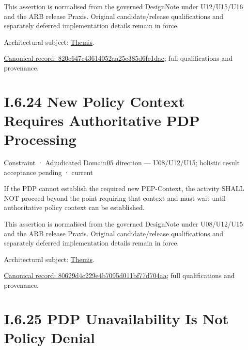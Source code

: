 This assertion is normalised from the governed DesignNote under U12/U15/U16 and the ARB release Praxis. Original candidate/release qualifications and separately deferred implementation details remain in force.



Architectural subject: \hyperref[element:899d34ec491948b68aad09e507dea6d1]{Themis}.


{\footnotesize \href{../../../../../../../../continuum/motivation/constraint/820e647c43614052aa25e385d6fe1dac.md}{Canonical record: 820e647c43614052aa25e385d6fe1dac}; full qualifications and provenance.}\par
\section*{I.6.24 New Policy Context Requires Authoritative PDP Processing}
\label{navigation:I.6.24}

\label{element:80629d4c229e4b7095d011bf77d704aa}
{\small Constraint · Adjudicated Domain05 direction — U08/U12/U15; holistic result acceptance pending · current}\par

If the PDP cannot establish the required new PEP-Context, the activity SHALL NOT proceed beyond the point requiring that context and must wait until authoritative policy context can be established.



This assertion is normalised from the governed DesignNote under U08/U12/U15 and the ARB release Praxis. Original candidate/release qualifications and separately deferred implementation details remain in force.



Architectural subject: \hyperref[element:899d34ec491948b68aad09e507dea6d1]{Themis}.


{\footnotesize \href{../../../../../../../../continuum/motivation/constraint/80629d4c229e4b7095d011bf77d704aa.md}{Canonical record: 80629d4c229e4b7095d011bf77d704aa}; full qualifications and provenance.}\par
\section*{I.6.25 PDP Unavailability Is Not Policy Denial}
\label{navigation:I.6.25}


